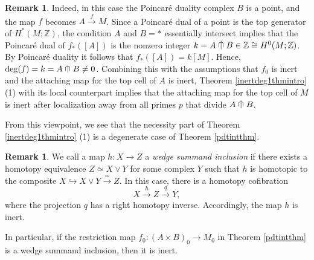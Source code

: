 \documentclass[a4]{amsart}
\theoremstyle{definition}
\newtheorem{remark}[theorem]{Remark}
\newcommand{\testcap}{\mathrel{\vcenter{\offinterlineskip
\hbox{$\cap$}\vskip-1.8ex\hbox{$\kern0.2em | \kern0.15em$}}}}
\begin{document}
\begin{sloppypar}
\begin{remark}
Indeed, in this case the Poincar\'{e} duality complex $B$ is a point, and the map $f$ becomes $A\stackrel{f}{\longrightarrow} M$. Since a Poincar\'{e} dual of a point is the top generator of $H^\ast(M;\mathbb{Z})$, the condition $A$ and $B=\ast$ essentially intersect implies that the Poincar\'{e} dual of $f_\ast([A])$ is the nonzero integer $k=A\testcap B\in \mathbb{Z}\cong H^0(M;\mathbb{Z})$. By Poincar\'{e} duality it follows that $f_\ast([A])=k[M]$. Hence, ${\rm deg}(f)= k=A\testcap B\neq 0$. Combining this with the assumptions that $f_0$ is inert and the attaching map for the top cell of $A$ is inert, Theorem \ref{inertdeg1thmintro} (1) with its local counterpart implies that the attaching map for the top cell of $M$ is inert after localization away from all primes $p$ that divide $A\testcap B$. 

From this viewpoint, we see that the necessity part of Theorem \ref{inertdeg1thmintro} (1) is a degenerate case of Theorem \ref{pdtintthm}.
\end{remark}

\begin{remark}
We call a map $h: X\stackrel{}{\longrightarrow} Z$ a {\it wedge summand inclusion} if there exists a homotopy equivalence $Z\simeq X\vee Y$ for some complex $Y$ such that $h$ is homotopic to the composite $X\stackrel{}{\hookrightarrow} X\vee Y\stackrel{\simeq}{\longrightarrow}Z$. In this case, there is a homotopy cofibration
\[
X\stackrel{h}{\longrightarrow}Z\stackrel{q}{\longrightarrow} Y,
\]
where the projection $q$ has a right homotopy inverse. Accordingly, the map $h$ is inert. 

In particular, if the restriction map $
f_0: (A\times B)_0\stackrel{}{\longrightarrow} M_0
$ in Theorem \ref{pdtintthm} 
is a wedge summand inclusion, then it is inert. 
\end{remark}


\end{sloppypar}
\end{document}
